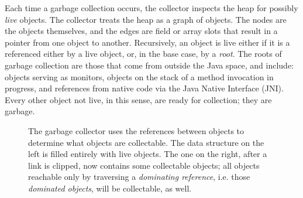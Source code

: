 Each time a garbage collection occurs, the collector inspects the heap for
possibly \emph{live} objects. The collector treats the heap as a graph of
objects. The nodes are the objects themselves, and the edges are field or array
slots that result in a pointer from one object to another.  Recursively, an object is live either if it is a referenced
either by a live object, or, in the base case, by a \emph{root}. The roots of
garbage collection are those that come from outside the Java space, and include:
objects serving as monitors, objects on the stack of a method invocation in
progress, and references from native code via the Java Native Interface (JNI).
Every other object not live, in this sense, are ready for collection; they are
garbage.

\begin{figure}
\centering
	\hspace{0.18\textwidth}
	\caption{The garbage collector uses the references between objects to
	determine what objects are collectable. The data structure on the left is
	filled entirely with live objects. The one on the right, after a link is
	clipped, now contains some collectable objects; all objects reachable only by
	traversing a \emph{dominating reference}, i.e. those \emph{dominated objects},
	will be collectable, as well.}
	\label{fig:reachability}
\end{figure}

